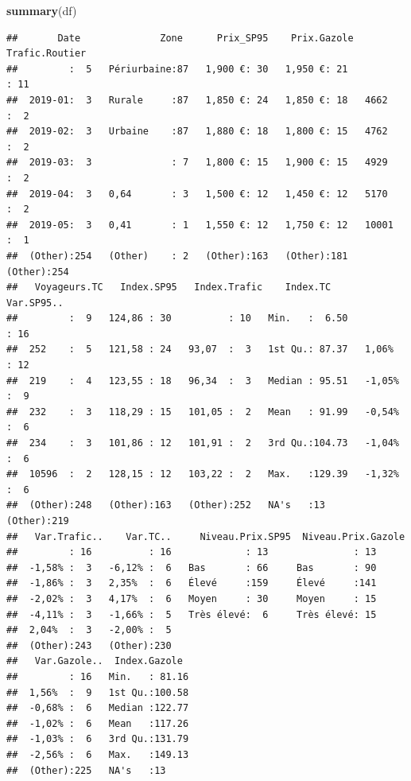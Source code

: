 \documentclass[
]{article}
\newenvironment{Shaded}{\begin{snugshade}}{\end{snugshade}}
\newcommand{\AttributeTok}[1]{\textcolor[rgb]{0.13,0.29,0.53}{#1}}
\newcommand{\CommentTok}[1]{\textcolor[rgb]{0.56,0.35,0.01}{\textit{#1}}}
\newcommand{\FunctionTok}[1]{\textcolor[rgb]{0.13,0.29,0.53}{\textbf{#1}}}
\newcommand{\NormalTok}[1]{#1}
\newcommand{\OtherTok}[1]{\textcolor[rgb]{0.56,0.35,0.01}{#1}}
\newcommand{\SpecialCharTok}[1]{\textcolor[rgb]{0.81,0.36,0.00}{\textbf{#1}}}
\newcommand{\StringTok}[1]{\textcolor[rgb]{0.31,0.60,0.02}{#1}}
\begin{document}
\begin{Shaded}
\begin{Highlighting}[]
\FunctionTok{summary}\NormalTok{(df)}
\end{Highlighting}
\end{Shaded}

\begin{verbatim}
##       Date              Zone      Prix_SP95    Prix.Gazole  Trafic.Routier
##         :  5   Périurbaine:87   1,900 €: 30   1,950 €: 21          : 11   
##  2019-01:  3   Rurale     :87   1,850 €: 24   1,850 €: 18   4662   :  2   
##  2019-02:  3   Urbaine    :87   1,880 €: 18   1,800 €: 15   4762   :  2   
##  2019-03:  3              : 7   1,800 €: 15   1,900 €: 15   4929   :  2   
##  2019-04:  3   0,64       : 3   1,500 €: 12   1,450 €: 12   5170   :  2   
##  2019-05:  3   0,41       : 1   1,550 €: 12   1,750 €: 12   10001  :  1   
##  (Other):254   (Other)    : 2   (Other):163   (Other):181   (Other):254   
##   Voyageurs.TC   Index.SP95   Index.Trafic    Index.TC        Var.SP95.. 
##         :  9   124,86 : 30          : 10   Min.   :  6.50          : 16  
##  252    :  5   121,58 : 24   93,07  :  3   1st Qu.: 87.37   1,06%  : 12  
##  219    :  4   123,55 : 18   96,34  :  3   Median : 95.51   -1,05% :  9  
##  232    :  3   118,29 : 15   101,05 :  2   Mean   : 91.99   -0,54% :  6  
##  234    :  3   101,86 : 12   101,91 :  2   3rd Qu.:104.73   -1,04% :  6  
##  10596  :  2   128,15 : 12   103,22 :  2   Max.   :129.39   -1,32% :  6  
##  (Other):248   (Other):163   (Other):252   NA's   :13       (Other):219  
##   Var.Trafic..    Var.TC..     Niveau.Prix.SP95  Niveau.Prix.Gazole
##         : 16          : 16             : 13               : 13     
##  -1,58% :  3   -6,12% :  6   Bas       : 66     Bas       : 90     
##  -1,86% :  3   2,35%  :  6   Élevé     :159     Élevé     :141     
##  -2,02% :  3   4,17%  :  6   Moyen     : 30     Moyen     : 15     
##  -4,11% :  3   -1,66% :  5   Très élevé:  6     Très élevé: 15     
##  2,04%  :  3   -2,00% :  5                                         
##  (Other):243   (Other):230                                         
##   Var.Gazole..  Index.Gazole   
##         : 16   Min.   : 81.16  
##  1,56%  :  9   1st Qu.:100.58  
##  -0,68% :  6   Median :122.77  
##  -1,02% :  6   Mean   :117.26  
##  -1,03% :  6   3rd Qu.:131.79  
##  -2,56% :  6   Max.   :149.13  
##  (Other):225   NA's   :13
\end{verbatim}

\begin{Shaded}
\end{Shaded}
\end{document}
